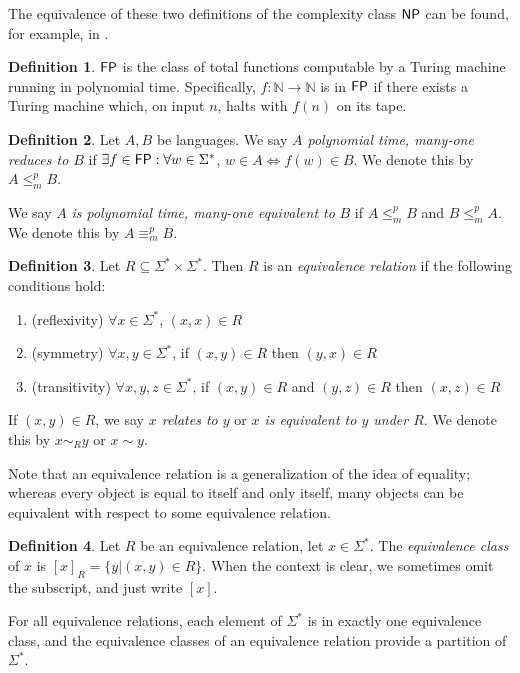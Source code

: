 \documentclass{amsart}
\theoremstyle{definition} \newtheorem{definition}[definition]{Definition}
\newcommand{\sigmastar}{\Sigma^{*}} %
\newcommand{\mor}{\leq^{p}_{m}} %
\newcommand{\moequiv}{\equiv^{p}_m} %
\newcommand{\defn}[1]{\emph{#1}} %
\begin{document}
The equivalence of these two definitions of the complexity class ${\mathsf{NP}}$ can be
found, for example, in \cite{sipser06}.

\begin{definition}
  ${\mathsf{FP}}$ is the class of total functions computable by a Turing machine running
  in polynomial time. Specifically, $f\colon\mathbb{N}\to\mathbb{N}$ is in
  ${\mathsf{FP}}$ if there exists a Turing machine which, on input $n$, halts with $f(n)$
  on its tape.
\end{definition}

\begin{definition}
  Let $A,B$ be languages. We say \defn{$A$ polynomial time, many-one reduces to
    $B$} if $\exists f\in\FP:\forall w\in\sigmastar$, $w\in A\iff f(w)\in
    B$. We denote this by $A\mor B$.
  
  We say $A$ \defn{is polynomial time, many-one equivalent to} $B$ if $A\mor
  B$ and $B\mor A$. We denote this by $A\moequiv B$.
\end{definition}

\begin{definition}
  Let $R\subseteq\sigmastar\times\sigmastar$. Then $R$ is an \defn{equivalence
    relation} if the following conditions hold:
  \renewcommand{\labelenumi}{\roman{enumi}.}
  \begin{enumerate}
  \item (reflexivity) $\forall x\in\sigmastar$, $(x, x)\in R$
  \item (symmetry) $\forall x,y\in\sigmastar$, if $(x,y)\in R$ then $(y,x)\in
    R$
  \item (transitivity) $\forall x,y,z\in\sigmastar$, if $(x,y)\in R$ and
    $(y,z)\in R$ then $(x,z)\in R$
  \end{enumerate}
  If $(x,y)\in R$, we say \defn{$x$ relates to $y$} or \defn{$x$ is equivalent
    to $y$ under $R$}. We denote this by $x\sim_R y$ or $x\sim y$.
\end{definition}

Note that an equivalence relation is a generalization of the idea of equality;
whereas every object is equal to itself and only itself, many objects can be
equivalent with respect to some equivalence relation.

\begin{definition}
  Let $R$ be an equivalence relation, let $x\in\sigmastar$. The
  \defn{equivalence class} of $x$ is $[x]_R=\{y|(x,y)\in R\}$. When the context
  is clear, we sometimes omit the subscript, and just write $[x]$.
\end{definition}
For all equivalence relations, each element of $\sigmastar$ is in exactly one
equivalence class, and the equivalence classes of an equivalence relation
provide a partition of $\sigmastar$.
\end{document}

